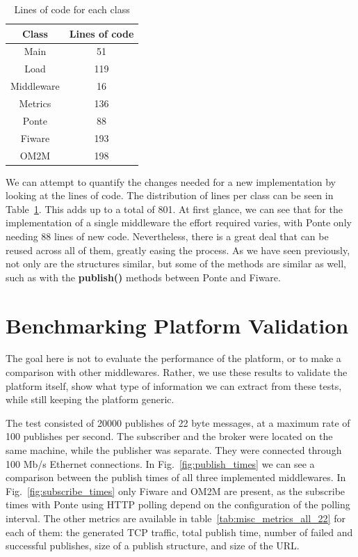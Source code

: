 \documentclass[conference]{IEEEtran}
\begin{document}
\begin{table}[htbp!]
  \centering
  \begin{tabular}{|c|c|}
    \hline 
    \textbf{Class} & \textbf{Lines of code} \\
    \hline 
    Main & 51 \\ 
    \hline
    Load & 119 \\
    \hline
    Middleware & 16 \\
    \hline
    Metrics & 136 \\
    \hline
    Ponte & 88 \\
    \hline
    Fiware & 193 \\
    \hline
    OM2M & 198 \\
    \hline
  \end{tabular}
  \vspace{1mm}
  \caption{Lines of code for each class}
  \label{tab:lines_code}
\end{table}

We can attempt to quantify the changes needed for a new implementation by looking at the lines of code. The distribution of lines per class can be seen in Table~\ref{tab:lines_code}. 
This adds up to a total of 801. At first glance, we can see that for the implementation of a single middleware the effort required varies, with Ponte only needing 88 lines of new code. Nevertheless, there is a great deal that can be reused across all of them, greatly easing the process. As we have seen previously, not only are the structures similar, but some of the methods are similar as well, such as with the \textbf{publish()} methods between Ponte and Fiware.

\section{Benchmarking Platform Validation}

The goal here is not to evaluate the performance of the platform, or to make a comparison with other middlewares. Rather, we use these results to validate the platform itself, show what type of information we can extract from these tests, while still keeping the platform generic.

The test consisted of 20000 publishes of 22 byte messages, at a maximum rate of 100 publishes per second. The subscriber and the broker were located on the same machine, while the publisher was separate. They were connected through 100 Mb/s Ethernet connections. In Fig.~\ref{fig:publish_times} we can see a comparison between the publish times of all three implemented middlewares. In Fig.~\ref{fig:subscribe_times} only Fiware and OM2M are present, as the subscribe times with Ponte using HTTP polling depend on the configuration of the polling interval. 
The other metrics are available in table~\ref{tab:misc_metrics_all_22} for each of them: the generated TCP traffic, total publish time, number of failed and successful publishes, size of a publish structure, and size of the URL.
\end{document}
